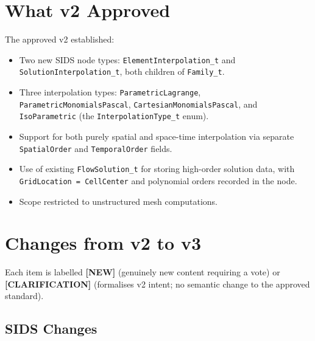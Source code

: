\documentclass[11pt,letterpaper]{article}
\newcommand{\NEW}{\textcolor{newgreen}{\textbf{[NEW]}}}
\newcommand{\CLARIFY}{\textcolor{clarifyyellow}{\textbf{[CLARIFICATION]}}}
\begin{document}
\section{What v2 Approved}

The approved v2 established:
\begin{itemize}
  \item Two new SIDS node types: \texttt{ElementInterpolation\_t} and
    \texttt{SolutionInterpolation\_t}, both children of \texttt{Family\_t}.
  \item Three interpolation types: \texttt{ParametricLagrange},
    \texttt{ParametricMonomialsPascal}, \texttt{CartesianMonomialsPascal}, and
    \texttt{IsoParametric} (the \texttt{InterpolationType\_t} enum).
  \item Support for both purely spatial and space-time interpolation via separate
    \texttt{SpatialOrder} and \texttt{TemporalOrder} fields.
  \item Use of existing \texttt{FlowSolution\_t} for storing high-order solution data, with
    \texttt{GridLocation = CellCenter} and polynomial orders recorded in the node.
  \item Scope restricted to unstructured mesh computations.
\end{itemize}

\section{Changes from v2 to v3}
\label{sec:changes}

Each item is labelled \NEW{} (genuinely new content requiring a vote) or
\CLARIFY{} (formalises v2 intent; no semantic change to the approved standard).

\subsection{SIDS Changes}
\end{document}
